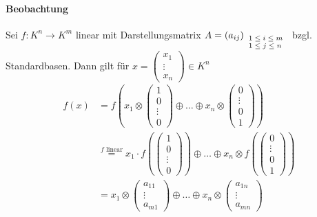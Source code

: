 \documentclass[a5paper, 10pt]{book}
\newcommand{\matrixwithsubscript}[5]{(#1_{#2#3})_{\scriptsize\begin{array}{l}1 \leq #2 \leq #4 \\ 1\leq #3 \leq #5\end{array}}}
\newcommand{\circleplus}{\oplus}%
\newcommand{\circlecdot}{\otimes}%
\begin{document}
				\paragraph{Beobachtung}
					Sei $f: K^n \to K^m$ linear mit Darstellungsmatrix $A = \matrixwithsubscript{a}{i}{j}{m}{n}$ bzgl. Standardbasen. Dann gilt für $x = \begin{pmatrix}
						x_1 \\ \vdots \\ x_n
					\end{pmatrix} \in K^n$
					\begin{align}
						f(x) &= f\left( x_1 \circlecdot \begin{pmatrix}
							1 \\ 0 \\ \vdots \\ 0
						\end{pmatrix} \circleplus \dots \circleplus x_n \circlecdot \begin{pmatrix}
							0 \\ \vdots \\ 0 \\ 1
						\end{pmatrix} \right) \\
						&\overset{f\text{ linear}}{=} x_1 \cdot f\left( \begin{pmatrix}
							1 \\ 0 \\ \vdots \\ 0
						\end{pmatrix} \right)\circleplus \dots \circleplus x_n \circlecdot f\left( \begin{pmatrix}
							0 \\ \vdots \\ 0  \\ 1
						\end{pmatrix} \right) \\
						&= x_1 \circlecdot \begin{pmatrix}
							a_{11} \\ \vdots \\ a_{m1}
						\end{pmatrix} \circleplus \dots \circleplus x_n \circlecdot \begin{pmatrix}
							a_{1n} \\ \vdots \\ a_{mn}
						\end{pmatrix}
					\end{align}
					
\end{document}
